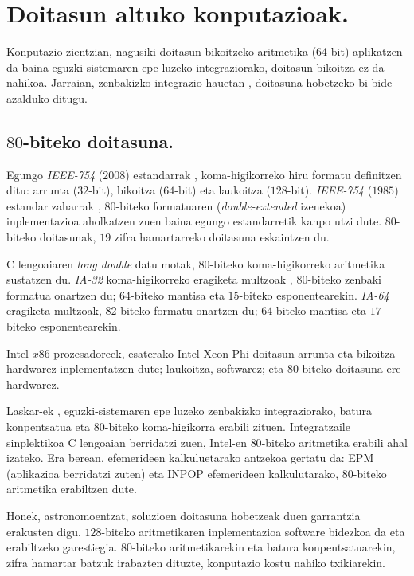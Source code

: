  
\section{Doitasun altuko konputazioak.}


Konputazio zientzian, nagusiki doitasun bikoitzeko aritmetika (64-bit) aplikatzen da baina eguzki-sistemaren epe luzeko integraziorako, doitasun bikoitza ez da nahikoa. Jarraian, zenbakizko integrazio hauetan \cite{Laskar2015}, doitasuna hobetzeko bi bide azalduko ditugu. 

\subsection*{$80$-biteko doitasuna.}

Egungo \emph{IEEE-754} ($2008$) estandarrak , koma-higikorreko hiru formatu definitzen ditu: arrunta ($32$-bit), bikoitza ($64$-bit) eta laukoitza ($128$-bit).  \emph{IEEE-754} ($1985$) estandar zaharrak , $80$-biteko formatuaren (\emph{double-extended} izenekoa) inplementazioa aholkatzen zuen \cite{Overton2001} baina egungo estandarretik kanpo utzi dute. $80$-biteko doitasunak, $19$ zifra hamartarreko doitasuna eskaintzen du.   

C lengoaiaren \emph{long double} datu motak, $80$-biteko koma-higikorreko aritmetika sustatzen du.  \emph{IA-32} koma-higikorreko eragiketa multzoak \cite{Muller2009}, $80$-biteko zenbaki formatua onartzen du; $64$-biteko mantisa eta $15$-biteko esponentearekin. \emph{IA-64} eragiketa multzoak, $82$-biteko formatu onartzen du; $64$-biteko mantisa eta $17$-biteko esponentearekin. 

Intel $x86$  prozesadoreek, esaterako Intel Xeon Phi \cite{IntelXeon2013} doitasun arrunta eta bikoitza hardwarez inplementatzen dute; laukoitza, softwarez; eta $80$-biteko doitasuna ere hardwarez.

Laskar-ek \cite{Laskar2011,Laskar2015}, eguzki-sistemaren epe luzeko zenbakizko integraziorako, batura konpentsatua eta $80$-biteko koma-higikorra erabili zituen. Integratzaile sinplektikoa C lengoaian berridatzi zuen, Intel-en $80$-biteko aritmetika erabili ahal izateko.
Era berean, efemerideen kalkuluetarako antzekoa gertatu da: EPM \cite{Pitjeva2014} (aplikazioa berridatzi zuten) eta INPOP \cite{Fienga2008} efemerideen kalkulutarako, $80$-biteko aritmetika erabiltzen dute.

Honek, astronomoentzat, soluzioen doitasuna hobetzeak duen garrantzia erakusten digu. $128$-biteko aritmetikaren inplementazioa software bidezkoa da eta erabiltzeko garestiegia. $80$-biteko aritmetikarekin eta batura konpentsatuarekin, zifra hamartar batzuk irabazten dituzte, konputazio kostu nahiko txikiarekin. 

